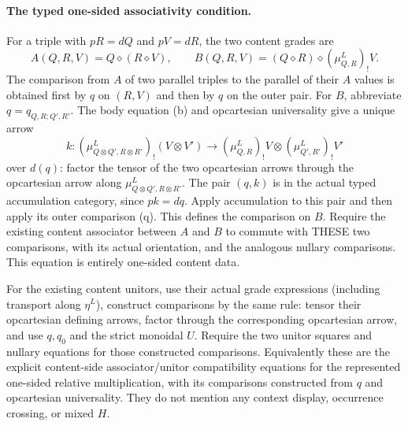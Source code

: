 \documentclass[11pt]{article}
\begin{document}
\paragraph{The typed one-sided associativity condition.}
For a triple with $pR=dQ$ and $pV=dR$, the two content grades are
\[
 A(Q,R,V)=Q\diamond(R\diamond V),\qquad
 B(Q,R,V)=(Q\diamond R)\diamond(\mu^L_{Q,R})_!V.
\]
The comparison from $A$ of two parallel triples to the parallel of their $A$ values is obtained first by $q$ on $(R,V)$ and then by $q$ on the outer pair. For $B$, abbreviate $q=q_{Q,R;Q',R'}$. The body equation (b) and opcartesian universality give a unique arrow
\[
 k:(\mu^L_{Q\otimes Q',R\otimes R'})_!(V\otimes V')
 \longrightarrow (\mu^L_{Q,R})_!V\otimes(\mu^L_{Q',R'})_!V'
\]
over $d(q)$: factor the tensor of the two opcartesian arrows through the opcartesian arrow along $\mu^L_{Q\otimes Q',R\otimes R'}$. The pair $(q,k)$ is in the actual typed accumulation category, since $pk=dq$. Apply accumulation to this pair and then apply its outer comparison (q). This defines the comparison on $B$. Require the existing content associator between $A$ and $B$ to commute with THESE two comparisons, with its actual orientation, and the analogous nullary comparisons. This equation is entirely one-sided content data.

For the existing content unitors, use their actual grade expressions (including transport along $\eta^L$), construct comparisons by the same rule: tensor their opcartesian defining arrows, factor through the corresponding opcartesian arrow, and use $q,q_0$ and the strict monoidal $U$. Require the two unitor squares and nullary equations for those constructed comparisons. Equivalently these are the explicit content-side associator/unitor compatibility equations for the represented one-sided relative multiplication, with its comparisons constructed from $q$ and opcartesian universality. They do not mention any context display, occurrence crossing, or mixed $H$.
\end{document}
